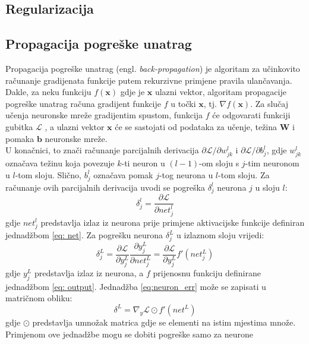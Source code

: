 \documentclass[times, utf8, zavrsni, numeric]{fer}
\renewcommand{\vec}[1]{\mathbf{#1}}
\begin{document}
\subsection{Regularizacija}

\subsection{Propagacija pogreške unatrag}
Propagacija pogreške unatrag (engl. \textit{back-propagation}) je algoritam
za učinkovito računanje gradijenata funkcije putem rekurzivne primjene pravila
ulančavanja. Dakle, za neku funkciju $f(\vec{x})$ gdje je $\vec{x}$ ulazni vektor,
algoritam propagacije pogreške unatrag računa gradijent funkcije $f$ u 
točki $\vec{x}$, tj. $\nabla f(\vec{x})$. Za slučaj učenja neuronske mreže
gradijentim spustom, funkcija $f$ će odgovarati funkciji gubitka $\mathcal{L}$
, a ulazni
vektor $\vec{x}$ će se sastojati od podataka za učenje, težina $\vec{W}$ i 
pomaka $\vec{b}$ neuronske mreže. 
\\\indent U konačnici, to znači računanje parcijalnih derivacija
$\partial \mathcal{L} / \partial w_{jk}^l$ i $\partial \mathcal{L} / \partial b_{j}^l$, gdje $w_{jk}^l$ označava težinu koja povezuje $k$-ti neuron u $(l-1)$-om
sloju s $j$-tim neuronom u $l$-tom sloju. Slično, $b_{j}^l$ označava pomak
$j$-tog neurona u $l$-tom sloju. Za računanje ovih parcijalnih derivacija
uvodi se pogreška $\delta_j^l$ neurona $j$ u sloju $l$:
\begin{equation}
	\delta_j^l = \frac{\partial \mathcal{L}}{\partial net_j^l}
\end{equation}
gdje $net_j^l$ predstavlja izlaz iz neurona prije primjene aktivacijske funkcije
definiran jednadžbom \ref{eq: net}. Za pogrešku neurona $\delta_j^L$
u izlaznom sloju vrijedi:
\begin{equation}
	\delta_j^L = \frac{\partial \mathcal{L}}{\partial y_j^L}
	\frac{\partial y_j^L}{\partial net_j^L} = 
	\frac{\partial \mathcal{L}}{\partial y_j^L} f'(net_j^L)
	\label{eq:neuron_err}
\end{equation}
gdje $y_j^L$ predstavlja izlaz iz neurona, a $f$ prijenosnu funkciju definirane
jednadžbom \ref{eq: output}. Jednadžba \ref{eq:neuron_err} može se zapisati
u matričnom obliku:
\begin{equation}
	\delta^L = \nabla_{y} \mathcal{L} \odot f'(net^L)
	\label{eq:neuron_err_mat}
\end{equation}
gdje $\odot$ predstavlja umnožak matrica gdje se elementi na istim mjestima
množe. Primjenom ove jednadžbe mogu se dobiti pogreške samo za neurone
\end{document}
